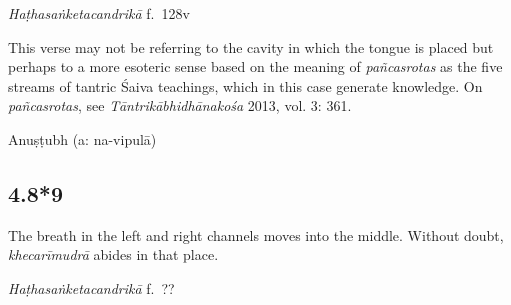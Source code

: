 \begin{ekdosis}

\begin{testimonia}[hp04_008_8]
\emph{Haṭhasaṅketacandrikā} f.~128v
\begin{versinnote}
\end{versinnote}
\end{testimonia}

\begin{philcomm}[hp04_008_8]
This verse may not be referring to the cavity in which the tongue is placed but perhaps to a more esoteric sense based on the meaning of \textit{pañcasrotas} as the five streams of tantric Śaiva teachings, which in this case generate knowledge. On \textit{pañcasrotas}, see \emph{Tāntrikābhidhānakośa} 2013, vol. 3: 361.
\end{philcomm}

\begin{metre}[hp04_008_8]
Anuṣṭubh (a: na-vipulā)
\end{metre}

\subsection*{4.8*9}
\begin{translation}[hp04_008_9]
The breath in the left and right channels moves into the middle. Without doubt, \emph{khecarīmudrā} abides in that place.
\end{translation}


\begin{testimonia}[hp04_008_9]
\emph{Haṭhasaṅketacandrikā} f.~??
\begin{versinnote}
\end{versinnote}
\end{testimonia}



\end{ekdosis}
